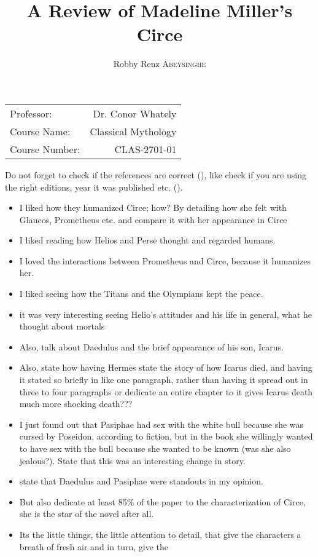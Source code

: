 \documentclass[12pt, a4paper]{article}
\author{Robby Renz \textsc{Abeysinghe}}
\title{A Review of Madeline Miller's Circe}
\begin{document}
\maketitle
\begin{center}
\begin{tabular}{l r}
Professor: & Dr. Conor Whately \\
Course Name: & Classical Mythology \\
Course Number: & CLAS-2701-01
\end{tabular}
\end{center}
\newpage

Do not forget to check if the references are correct (\cite{homer_odyssey_1998}), like check if you are using the right editions, year it was published etc. (\cite{miller_circe_2018}).

\begin{itemize}
	\item I liked how they humanized Circe; how? By detailing how she felt with Glaucos, Prometheus etc. and compare it with her appearance in Circe
	\item I liked reading how Helios and Perse thought and regarded humans.
	\item I loved the interactions between Prometheus and Circe, because it humanizes her.
	\item I liked seeing how the Titans and the Olympians kept the peace.
	\item it was very interesting seeing Helio's attitudes and his life in general, what he thought about mortals
	\item Also, talk about Daedulus and the brief appearance of his son, Icarus.
	\item Also, state how having Hermes state the story of how Icarus died, and having it stated so briefly in like one paragraph, rather than having it spread out in three to four paragraphs or dedicate an entire chapter to it gives Icarus death much more shocking death???
	\item I just found out that Pasiphae had sex with the white bull because she was cursed by Poseidon, according to fiction, but in the book she willingly wanted to have sex with the bull because she wanted to be known (was she also jealous?). State that this was an interesting change in story.
	\item state that Daedulus and Pasiphae were standouts in my opinion.
	\item But also dedicate at least 85\% of the paper to the characterization of Circe, she is the star of the novel after all.
	\item Its the little things, the little attention to detail, that give the characters a breath of fresh air and in turn, give the 
\end{itemize}
\end{document}
